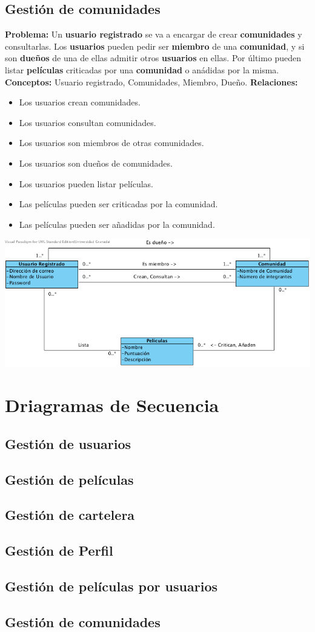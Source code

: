 \documentclass{article}
\begin{document}
	\subsection*{Gestión de comunidades}
	\textbf{Problema:} Un \textbf{usuario registrado} se va a encargar de crear \textbf{comunidades} y consultarlas. Los \textbf{usuarios} pueden pedir ser \textbf{miembro} de una \textbf{comunidad}, y si son \textbf{dueños} de una de ellas admitir otros \textbf{usuarios} en ellas. Por último pueden listar \textbf{películas} criticadas por una \textbf{comunidad} o anádidas por la misma.\\
	\textbf{Conceptos:} Usuario registrado, Comunidades, Miembro, Dueño.
	\textbf{Relaciones:}
		\begin{itemize}
			\item Los usuarios crean comunidades.
			\item Los usuarios consultan comunidades.
			\item Los usuarios son miembros de otras comunidades.
			\item Los usuarios son dueños de comunidades.
			\item Los usuarios pueden listar películas.
			\item Las películas pueden ser criticadas por la comunidad.
			\item Las películas pueden ser añadidas por la comunidad.
		\end{itemize}
		\includegraphics[width=1\linewidth]{./C-Comunidades}
\section{Driagramas de Secuencia}
	\subsection*{Gestión de usuarios}
	\subsection*{Gestión de películas}
	\subsection*{Gestión de cartelera}
	\subsection*{Gestión de Perfil}
	\subsection*{Gestión de películas por usuarios}
	\subsection*{Gestión de comunidades}
\end{document}
